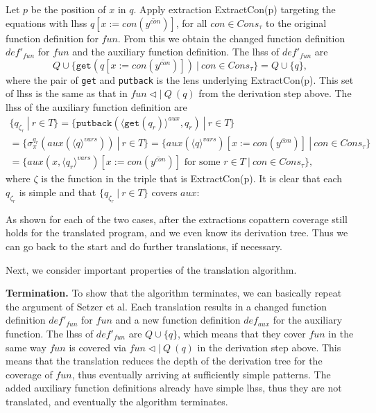 \begin{algorithm}
\begin{enumerate}
Let $p$ be the position of $x$ in $q$. Apply extraction \textsf{ExtractCon}(p) targeting the equations with lhss $q[x := con(\overline{y^{con}})]$, for all $con \in Cons_\tau$ to the original function definition for $fun$. From this we obtain the changed function definition $def'_{fun}$ for $fun$ and the auxiliary function definition. The lhss of $def'_{fun}$ are
\[
Q \cup \{ \texttt{get}(q[x := con(\overline{y^{con}})]) ~ | ~ con \in Cons_\tau \} = Q \cup \{q\},
\]
where the pair of \texttt{get} and \texttt{putback} is the lens underlying \textsf{ExtractCon}(p). This set of lhss is the same as that in $fun \lhd | ~ Q ~ (q)$ from the derivation step above. The lhss of the auxiliary function definition are
\begin{multline*}
\{ q_{\zeta_r} ~ | ~ r \in T \} = \{ \texttt{putback}(\langle \texttt{get}(q_r) \rangle^{aux}, q_r) ~ | ~ r \in T \} \\
= \{ \sigma^{q_r}_\pi(aux(\langle q \rangle^{vars})) ~ | ~ r \in T \} = \{ aux(\langle q \rangle^{vars})[x := con(\overline{y^{con}})] ~ | ~ con \in Cons_\tau \} \\
= \{ aux(x, \langle q_r \rangle^{vars})[x := con(\overline{y^{con}})] \text{ for some } r \in T ~ | ~ con \in Cons_\tau \},
\end{multline*}
where $\zeta$ is the function in the triple that is \textsf{ExtractCon}(p). It is clear that each $q_{\zeta_r}$ is simple and that $\{ q_{\zeta_r} ~ | ~ r \in T \}$ covers $aux$:
\begin{prooftree}
\AxiomC{}
\end{prooftree}
\end{enumerate}

As shown for each of the two cases, after the extractions copattern coverage still holds for the translated program, and we even know its derivation tree. Thus we can go back to the start and do further translations, if necessary.
\end{algorithm}

Next, we consider important properties of the translation algorithm.

\textbf{Termination.} To show that the algorithm terminates, we can basically repeat the argument of Setzer et al. Each translation results in a changed function definition $def'_{fun}$ for $fun$ and a new function definition $def_{aux}$ for the auxiliary function. The lhss of $def'_{fun}$ are $Q \cup \{q\}$, which means that they cover $fun$ in the same way $fun$ is covered via $fun \lhd | ~ Q ~ (q)$ in the derivation step above. This means that the translation reduces the depth of the derivation tree for the coverage of $fun$, thus eventually arriving at sufficiently simple patterns. The added auxiliary function definitions already have simple lhss, thus they are not translated, and eventually the algorithm terminates.

